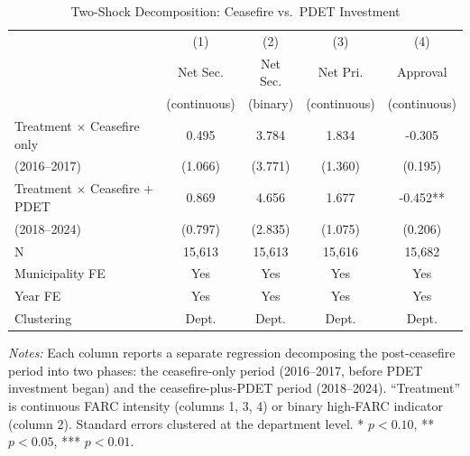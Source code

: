 \begin{table}[H]
\centering
\caption{Two-Shock Decomposition: Ceasefire vs.\ PDET Investment}
\label{tab:twoshock}
\begin{threeparttable}
\begin{tabular}{lcccc}
\toprule
 & (1) & (2) & (3) & (4) \\
 & Net Sec. & Net Sec. & Net Pri. & Approval \\
 & (continuous) & (binary) & (continuous) & (continuous) \\
\midrule
Treatment $\times$ Ceasefire only & 0.495 & 3.784 & 1.834 & -0.305 \\
\quad (2016--2017) & (1.066) & (3.771) & (1.360) & (0.195) \\
Treatment $\times$ Ceasefire + PDET & 0.869 & 4.656 & 1.677 & -0.452** \\
\quad (2018--2024) & (0.797) & (2.835) & (1.075) & (0.206) \\
N & 15,613 & 15,613 & 15,616 & 15,682 \\
\midrule
Municipality FE & Yes & Yes & Yes & Yes \\
Year FE & Yes & Yes & Yes & Yes \\
Clustering & Dept. & Dept. & Dept. & Dept. \\
\bottomrule
\end{tabular}
\begin{tablenotes}[flushleft]
\small
\item \textit{Notes:} Each column reports a separate regression decomposing the post-ceasefire period into two phases: the ceasefire-only period (2016--2017, before PDET investment began) and the ceasefire-plus-PDET period (2018--2024). ``Treatment'' is continuous FARC intensity (columns 1, 3, 4) or binary high-FARC indicator (column 2). Standard errors clustered at the department level. * $p<0.10$, ** $p<0.05$, *** $p<0.01$.
\end{tablenotes}
\end{threeparttable}
\end{table}


